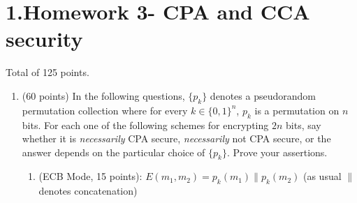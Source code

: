\documentclass{article}
\begin{document}
\newcommand{\zo}{\{0,1\}}
\newcommand{\E}{\mathbb{E}}
\newcommand{\getsr}{\leftarrow_R\;}
\section{1.\hspace*{0.5em}Homework 3- CPA and CCA security}\label{sec-homework-3--cpa-and-cca-security}%

\noindent{}Total of 125 points.%

\begin{enumerate}%

\item{}
(60 points) In the following questions, $\{ p_k \}$ denotes a pseudorandom permutation collection where for
every $k \in \zo^n$, $p_k$ is a permutation on $n$ bits. For each one of the following schemes for 
encrypting $2n$ bits, say whether it is \emph{necessarily} CPA secure, \emph{necessarily} not CPA secure, 
or the answer depends on the particular choice of $\{ p_k \}$. Prove your assertions.%

\begin{enumerate}[,label=\alph*.]%

\item{}
(ECB Mode, 15 points): $E(m_1,m_2)= p_k(m_1)\|p_k(m_2)$ (as usual $\|$ denotes concatenation)%


\end{enumerate}
\end{enumerate}
\end{document}
